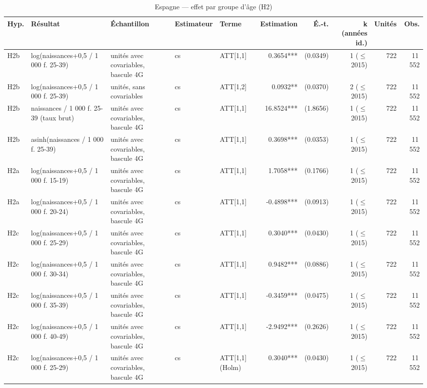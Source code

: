 \begin{table}\centering
\begin{threeparttable}
\caption{Espagne — effet par groupe d'âge (H2)}\label{tab:es_h2age}
\scriptsize
\begin{tabular}{lp{4.8cm}p{5.1cm}lp{4.3cm}rrrrr}
\toprule
Hyp. & Résultat & Échantillon & Estimateur & Terme & Estimation & É.-t. & k (années id.) & Unités & Obs. \\
\midrule
H2b & log(naissances+0,5 / 1 000 f. 25-39) & unités avec covariables, bascule 4G & cs & ATT[1,1] & 0.3654*** & (0.0349) & 1 ($\leq$ 2015) & 722 & 11\,552 \\
H2b & log(naissances+0,5 / 1 000 f. 25-39) & unités, sans covariables & cs & ATT[1,2] & 0.0932** & (0.0370) & 2 ($\leq$ 2015) & 722 & 11\,552 \\
H2b & naissances / 1 000 f. 25-39 (taux brut) & unités avec covariables, bascule 4G & cs & ATT[1,1] & 16.8524*** & (1.8656) & 1 ($\leq$ 2015) & 722 & 11\,552 \\
H2b & asinh(naissances / 1 000 f. 25-39) & unités avec covariables, bascule 4G & cs & ATT[1,1] & 0.3698*** & (0.0353) & 1 ($\leq$ 2015) & 722 & 11\,552 \\
H2a & log(naissances+0,5 / 1 000 f. 15-19) & unités avec covariables, bascule 4G & cs & ATT[1,1] & 1.7058*** & (0.1766) & 1 ($\leq$ 2015) & 722 & 11\,552 \\
H2a & log(naissances+0,5 / 1 000 f. 20-24) & unités avec covariables, bascule 4G & cs & ATT[1,1] & -0.4898*** & (0.0913) & 1 ($\leq$ 2015) & 722 & 11\,552 \\
H2c & log(naissances+0,5 / 1 000 f. 25-29) & unités avec covariables, bascule 4G & cs & ATT[1,1] & 0.3040*** & (0.0430) & 1 ($\leq$ 2015) & 722 & 11\,552 \\
H2c & log(naissances+0,5 / 1 000 f. 30-34) & unités avec covariables, bascule 4G & cs & ATT[1,1] & 0.9482*** & (0.0886) & 1 ($\leq$ 2015) & 722 & 11\,552 \\
H2c & log(naissances+0,5 / 1 000 f. 35-39) & unités avec covariables, bascule 4G & cs & ATT[1,1] & -0.3459*** & (0.0475) & 1 ($\leq$ 2015) & 722 & 11\,552 \\
H2c & log(naissances+0,5 / 1 000 f. 40-49) & unités avec covariables, bascule 4G & cs & ATT[1,1] & -2.9492*** & (0.2626) & 1 ($\leq$ 2015) & 722 & 11\,552 \\
H2c & log(naissances+0,5 / 1 000 f. 25-29) & unités avec covariables, bascule 4G & cs & ATT[1,1] (Holm) & 0.3040*** & (0.0430) & 1 ($\leq$ 2015) & 722 & 11\,552 \\

\end{tabular}
\end{threeparttable}
\end{table}
